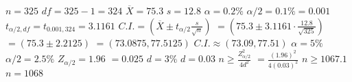 \documentclass{article}
\begin{document}
    $n=325$
$df = 325-1 = 324$
$\overline{X} = 75.3$
$s = 12.8$
$\alpha = 0.2\%$
$\alpha/2 = 0.1\% = 0.001$
$t_{\alpha/2, df} = t_{0.001, 324} = 3.1161$
$C.I. = (\overline{X} \pm t_{\alpha/2} \frac{s}{\sqrt{n}})$
$= (75.3 \pm 3.1161 \cdot \frac{12.8}{\sqrt{325}})$
$= (75.3 \pm 2.2125)$
$= (73.0875, 77.5125)$
$C.I. \approx (73.09, 77.51)$
$\alpha = 5\%$
$\alpha/2 = 2.5\%$
$Z_{\alpha/2} = 1.96$
$=0.025$
$d=3\%$
$d=0.03$
$n \ge \frac{Z_{\alpha/2}^2}{4d^2}$
$= \frac{(1.96)^2}{4(0.03)^2}$
$n \ge 1067.1$
$n = 1068$

    
\end{document}
